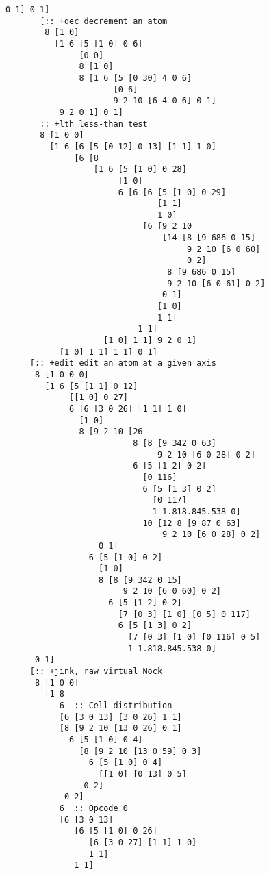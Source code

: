 \documentclass[twoside]{article}
\begin{document}
\begin{lstlisting}[style=listingcode]
           0 1] 0 1]
       [:: +dec decrement an atom
        8 [1 0]
          [1 6 [5 [1 0] 0 6]
               [0 0]
               8 [1 0]
               8 [1 6 [5 [0 30] 4 0 6]
                      [0 6]
                      9 2 10 [6 4 0 6] 0 1]
           9 2 0 1] 0 1]
       :: +lth less-than test
       8 [1 0 0]
         [1 6 [6 [5 [0 12] 0 13] [1 1] 1 0]
              [6 [8
                  [1 6 [5 [1 0] 0 28]
                       [1 0]
                       6 [6 [6 [5 [1 0] 0 29]
                               [1 1]
                               1 0]
                            [6 [9 2 10
                                [14 [8 [9 686 0 15]
                                     9 2 10 [6 0 60]
                                     0 2]
                                 8 [9 686 0 15]
                                 9 2 10 [6 0 61] 0 2]
                                0 1]
                               [1 0]
                               1 1]
                           1 1]
                    [1 0] 1 1] 9 2 0 1]
           [1 0] 1 1] 1 1] 0 1]
     [:: +edit edit an atom at a given axis
      8 [1 0 0 0]
        [1 6 [5 [1 1] 0 12]
             [[1 0] 0 27]
             6 [6 [3 0 26] [1 1] 1 0]
               [1 0]
               8 [9 2 10 [26
                          8 [8 [9 342 0 63]
                               9 2 10 [6 0 28] 0 2]
                          6 [5 [1 2] 0 2]
                            [0 116]
                            6 [5 [1 3] 0 2]
                              [0 117]
                              1 1.818.845.538 0]
                            10 [12 8 [9 87 0 63]
                                9 2 10 [6 0 28] 0 2]
                   0 1]
                 6 [5 [1 0] 0 2]
                   [1 0]
                   8 [8 [9 342 0 15]
                        9 2 10 [6 0 60] 0 2]
                     6 [5 [1 2] 0 2]
                       [7 [0 3] [1 0] [0 5] 0 117]
                       6 [5 [1 3] 0 2]
                         [7 [0 3] [1 0] [0 116] 0 5]
                         1 1.818.845.538 0]
      0 1]
     [:: +jink, raw virtual Nock
      8 [1 0 0]
        [1 8
           6  :: Cell distribution
           [6 [3 0 13] [3 0 26] 1 1]
           [8 [9 2 10 [13 0 26] 0 1]
             6 [5 [1 0] 0 4]
               [8 [9 2 10 [13 0 59] 0 3]
                 6 [5 [1 0] 0 4]
                   [[1 0] [0 13] 0 5]
                0 2]
            0 2]
           6  :: Opcode 0
           [6 [3 0 13]
              [6 [5 [1 0] 0 26]
                 [6 [3 0 27] [1 1] 1 0]
                 1 1]
              1 1]

\end{lstlisting}
\end{document}
